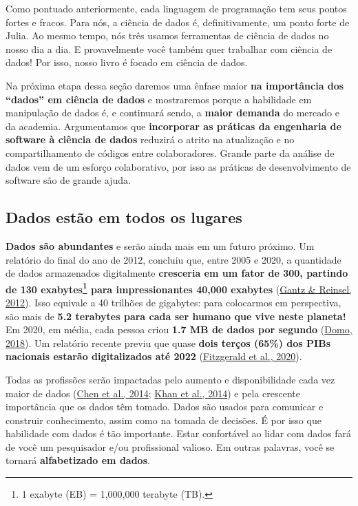 \documentclass[
  notoc %
]{tufte-book}
\begin{document}
Como pontuado anteriormente, cada linguagem de programação tem seus
pontos fortes e fracos. Para nós, a ciência de dados é, definitivamente,
um ponto forte de Julia. Ao mesmo tempo, nós três usamos ferramentas de
ciência de dados no nosso dia a dia. E provavelmente você também quer
trabalhar com ciência de dados! Por isso, nosso livro é focado em
ciência de dados.

Na próxima etapa dessa seção daremos uma ênfase maior \textbf{na
importância dos ``dados'' em ciência de dados} e mostraremos porque a
habilidade em manipulação de dados é, e continuará sendo, a
\textbf{maior demanda} do mercado e da academia. Argumentamos que
\textbf{incorporar as práticas da engenharia de software à ciência de
dados} reduzirá o atrito na atualização e no compartilhamento de códigos
entre colaboradores. Grande parte da análise de dados vem de um esforço
colaborativo, por isso as práticas de desenvolvimento de software são de
grande ajuda.

\hypertarget{sec:data_everywhere}{%
\subsection{Dados estão em todos os lugares}\label{sec:data_everywhere}}

\textbf{Dados são abundantes} e serão ainda mais em um futuro próximo.
Um relatório do final do ano de 2012, concluiu que, entre 2005 e 2020, a
quantidade de dados armazenados digitalmente \textbf{cresceria em um
fator de 300, partindo de 130 exabytes\footnote{1 exabyte (EB) =
  1,000,000 terabyte (TB).} para impressionantes 40,000 exabytes}
(\protect\hyperlink{ref-gantz2012digital}{Gantz \& Reinsel, 2012}). Isso
equivale a 40 trilhões de gigabytes: para colocarmos em perspectiva, são
mais de \textbf{5.2 terabytes para cada ser humano que vive neste
planeta!} Em 2020, em média, cada pessoa criou \textbf{1.7 MB de dados
por segundo} (\protect\hyperlink{ref-domo2018data}{Domo, 2018}). Um
relatório recente previu que quase \textbf{dois terços (65\%) dos PIBs
nacionais estarão digitalizados até 2022}
(\protect\hyperlink{ref-fitzgerald2020idc}{Fitzgerald et al., 2020}).

Todas as profissões serão impactadas pelo aumento e disponibilidade cada
vez maior de dados (\protect\hyperlink{ref-chen2014big}{Chen et al.,
2014}; \protect\hyperlink{ref-khan2014big}{Khan et al., 2014}) e pela
crescente importância que os dados têm tomado. Dados são usados para
comunicar e construir conhecimento, assim como na tomada de decisões. É
por isso que habilidade com dados é tão importante. Estar confortável ao
lidar com dados fará de você um pesquisador e/ou profissional valioso.
Em outras palavras, você se tornará \textbf{alfabetizado em dados}.
\end{document}
